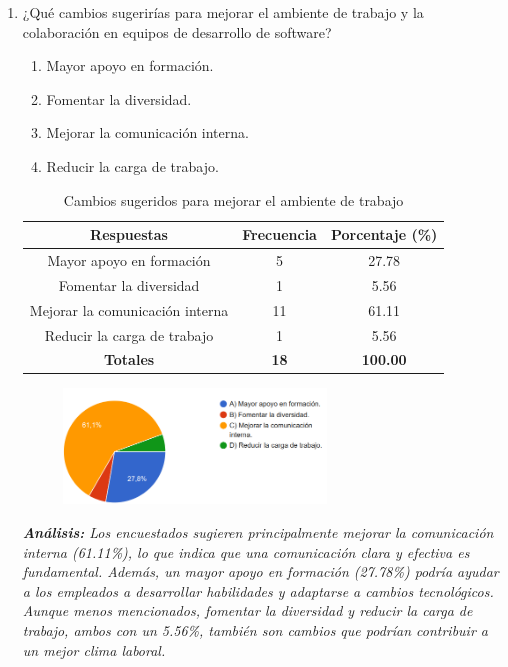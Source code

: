\documentclass[journal]{IEEEtran}
\begin{document}
\begin{enumerate}
	\item ¿Qué cambios sugerirías para mejorar el ambiente de trabajo y la colaboración en equipos de desarrollo de software?
	\begin{enumerate}
		\item Mayor apoyo en formación.
		\item Fomentar la diversidad.
		\item Mejorar la comunicación interna.
		\item Reducir la carga de trabajo.
	\end{enumerate}
	\begin{table}[H]
		\renewcommand{\arraystretch}{1.3}
		\centering
		\caption{Cambios sugeridos para mejorar el ambiente de trabajo}
		\begin{tabular}{c c c}
			\hline
			\textbf{Respuestas} & \textbf{Frecuencia} & \textbf{Porcentaje (\%)}\\
			\hline
			Mayor apoyo en formación & 5 & 27.78\\
			Fomentar la diversidad & 1 & 5.56\\
			Mejorar la comunicación interna & 11 & 61.11\\
			Reducir la carga de trabajo & 1 & 5.56\\
			\hline
			\textbf{Totales} &\textbf{18}& \textbf{100.00}\\
			\hline
		\end{tabular}
	\end{table}
	\begin{figure}[h]
		\centering
		\includegraphics[width=07cm]{Pregunta22}
	\end{figure}
	\textit{\textbf{Análisis:} Los encuestados sugieren principalmente mejorar la comunicación interna (61.11\%), lo que indica que una comunicación clara y efectiva es fundamental. Además, un mayor apoyo en formación (27.78\%) podría ayudar a los empleados a desarrollar habilidades y adaptarse a cambios tecnológicos. Aunque menos mencionados, fomentar la diversidad y reducir la carga de trabajo, ambos con un 5.56\%, también son cambios que podrían contribuir a un mejor clima laboral.}\\
	
\end{enumerate}
\end{document}
